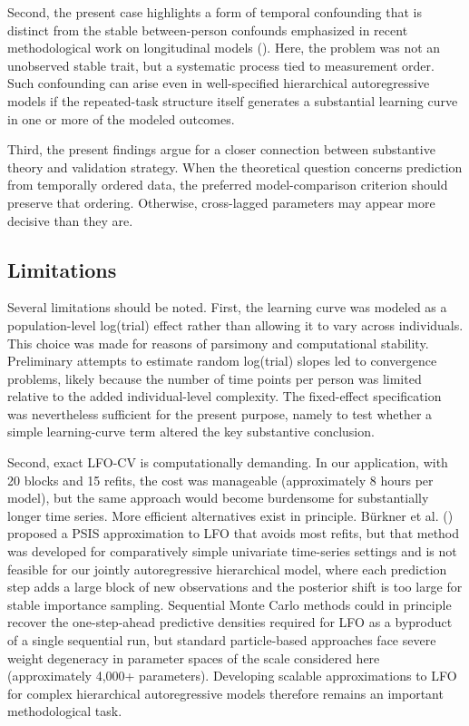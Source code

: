 \documentclass[
  man,
  floatsintext,
  longtable,
  nolmodern,
  notxfonts,
  notimes,
  colorlinks=true,linkcolor=blue,citecolor=blue,urlcolor=blue]{apa7}
\begin{document}
Second, the present case highlights a form of temporal confounding that
is distinct from the stable between-person confounds emphasized in
recent methodological work on longitudinal models
().
Here, the problem was not an unobserved stable trait, but a systematic
process tied to measurement order. Such confounding can arise even in
well-specified hierarchical autoregressive models if the repeated-task
structure itself generates a substantial learning curve in one or more
of the modeled outcomes.

Third, the present findings argue for a closer connection between
substantive theory and validation strategy. When the theoretical
question concerns prediction from temporally ordered data, the preferred
model-comparison criterion should preserve that ordering. Otherwise,
cross-lagged parameters may appear more decisive than they are.

\subsection{Limitations}\label{limitations}

Several limitations should be noted. First, the learning curve was
modeled as a population-level log(trial) effect rather than allowing it
to vary across individuals. This choice was made for reasons of
parsimony and computational stability. Preliminary attempts to estimate
random log(trial) slopes led to convergence problems, likely because the
number of time points per person was limited relative to the added
individual-level complexity. The fixed-effect specification was
nevertheless sufficient for the present purpose, namely to test whether
a simple learning-curve term altered the key substantive conclusion.

Second, exact LFO-CV is computationally demanding. In our application,
with 20 blocks and 15 refits, the cost was manageable (approximately 8
hours per model), but the same approach would become burdensome for
substantially longer time series. More efficient alternatives exist in
principle. Bürkner et al. ()
proposed a PSIS approximation to LFO that avoids most refits, but that
method was developed for comparatively simple univariate time-series
settings and is not feasible for our jointly autoregressive hierarchical
model, where each prediction step adds a large block of new observations
and the posterior shift is too large for stable importance sampling.
Sequential Monte Carlo methods could in principle recover the
one-step-ahead predictive densities required for LFO as a byproduct of a
single sequential run, but standard particle-based approaches face
severe weight degeneracy in parameter spaces of the scale considered
here (approximately 4,000+ parameters). Developing scalable
approximations to LFO for complex hierarchical autoregressive models
therefore remains an important methodological task.
\end{document}
